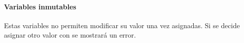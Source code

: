 
\paragraph{Variables inmutables} Estas variables no permiten modificar su valor una vez
asignadas. Si se decide asignar otro valor con \codeline{=} se mostrará un error. 

